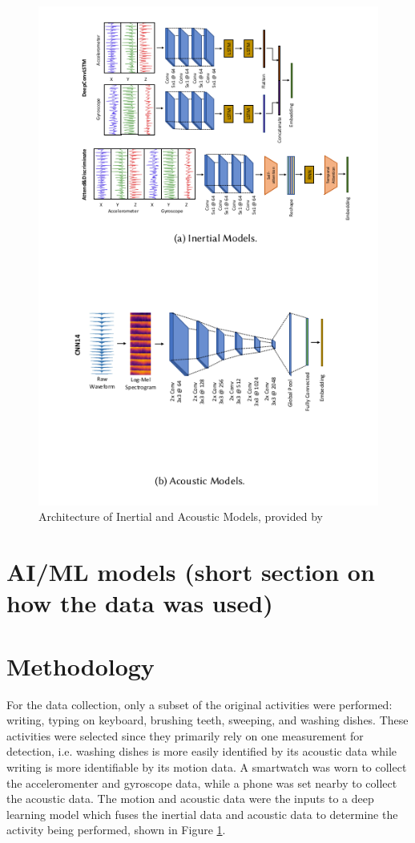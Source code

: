 \documentclass[conference]{IEEEtran}
\begin{document}
	\begin{figure}[h]
		\centering
		\includegraphics[scale=0.50]{Architecture_of_Inertial_and_Acoustic_Models}
		\caption{Architecture of Inertial and Acoustic Models, provided by \cite{2022_Leveraging_sound}}
		\label{fig: Architecture_of_Inertial_and_Acoustic_Models}
	\end{figure}
	
	\section{AI/ML models (short section on how the data was used)}
	
	\section{Methodology}
	For the data collection, only a subset of the original activities were performed: writing, typing on keyboard, brushing teeth, sweeping, and washing dishes.
	These activities were selected since they primarily rely on one measurement for detection, i.e. washing dishes is more easily identified by its acoustic data while writing is more identifiable by its motion data.
	A smartwatch was worn to collect the acceleromenter and gyroscope data, while a phone was set nearby to collect the acoustic data.
	The motion and acoustic data were the inputs to a deep learning model which fuses the inertial data and acoustic data to determine the activity being performed, shown in Figure \ref{fig: Architecture_of_Inertial_and_Acoustic_Models}.
	
\end{document}
